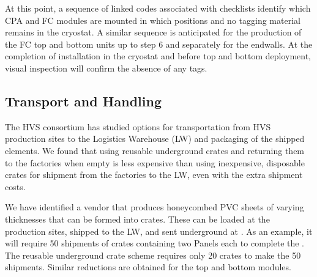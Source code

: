 At this point, %
a sequence of linked codes associated with  checklists %
identify which CPA and FC modules %
are mounted in %
which  positions and no tagging material remains in the cryostat.  A similar sequence is anticipated for the production of the FC top and bottom units up to step 6 and separately for the endwalls.  
At the completion of installation in the cryostat and before  top and bottom deployment, visual inspection will confirm the absence of any tags.

\subsection{Transport and Handling}
\label{sec:fdsp-hv-transport-transport}

The HVS consortium has studied %
options for %
transportation from HVS production sites %
to the Logistics Warehouse (LW) %
and packaging of the shipped elements. %
We found that using reusable underground 
crates and returning them to the factories when empty is less expensive than using inexpensive, disposable crates for shipment from the factories to the LW,  
even with the extra shipment costs. %

We have identified a vendor that %
produces honeycombed PVC sheets of varying thicknesses that can be formed into crates. These %
can be loaded at the production sites, %
shipped to the LW, and sent underground at \surf.  
As an example, %
it will require 50 shipments of crates containing two  Panels each to complete the .  %
The reusable underground crate scheme requires only 20 crates to make the 50 shipments. Similar reductions are obtained for the top and bottom  modules. 

